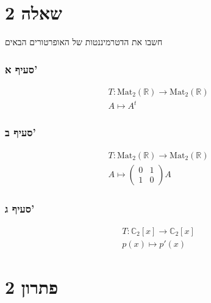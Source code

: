 \documentclass[12pt, titlepage]{article}
\begin{document}
\part*{שאלה 2}
חשבו את הדטרמיננטות של האופרטורים הבאים
\section*{סעיף א'}
\begin{gather*}
    T:\mathrm{Mat}_2\left(\mathbb{R}\right) \to \mathrm{Mat}_2\left(\mathbb{R}\right) \\
    A\mapsto A^t
\end{gather*}
\section*{סעיף ב'}
\begin{gather*}
    T:\mathrm{Mat}_2\left(\mathbb{R}\right) \to \mathrm{Mat}_2\left(\mathbb{R}\right) \\
    A\mapsto \begin{pmatrix}
        0 & 1 \\ 1 & 0
    \end{pmatrix}A
\end{gather*}
\section*{סעיף ג'}
\begin{gather*}
    T:\mathbb{C}_2\left[x\right] \to\mathbb{C}_2\left[x\right]  \\
    p\left(x\right)\mapsto p'\left(x\right)
\end{gather*}
\part*{פתרון 2}
\end{document}
